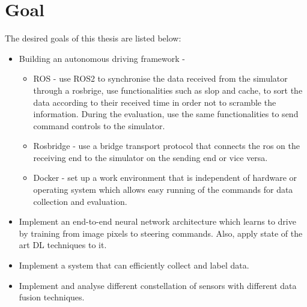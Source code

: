 \begin{figure}
    \centering
    \def\svgwidth{\columnwidth}
    
\end{figure}


\section{Goal}
    The desired goals of this thesis are listed below: 

\begin{itemize}
    \item Building an autonomous driving framework -
        \begin{itemize}
        \item ROS - use ROS2 to synchronise the data received from the simulator through a
            rosbrige, use functionalities such as slop and cache, to sort the data according to
            their received time in order not to scramble the information. During the evaluation,
            use the same functionalities to send command controls to the simulator.
        \item Rosbridge - use a bridge transport protocol that connects the ros on the receiving end
            to the simulator on the sending end or vice versa.
        \item Docker - set up a work environment that is independent of hardware or
            operating system which allows easy running of the commands for data collection
            and evaluation.
        \end{itemize}    
    \item Implement an end-to-end neural network architecture which learns to drive by
        training from image pixels to steering commands. Also, apply state of
        the art DL techniques to it.
    \item Implement a system that can efficiently collect and label data.
    \item Implement and analyse different constellation of sensors with different data
        fusion techniques. 
\end{itemize}

